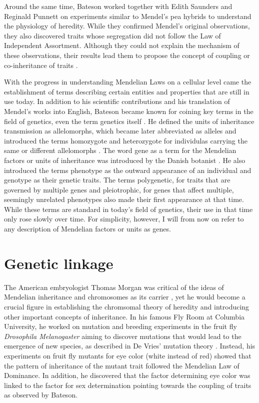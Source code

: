 Around the same time, Bateson worked together with Edith Saunders and Reginald Punnett on experiments similar to Mendel's pea hybrids to understand the physiology of heredity. While they confirmed Mendel's original observations, they also discovered traits whose segregation did not follow the Law of Independent Assortment. Although they could not explain the mechanism of these observations, their results lead them to propose the concept of coupling or co-inheritance of traits \citep{Bateson1905}. 

With the progress in understanding Mendelian Laws on a cellular level came the establishment of terms describing certain entities and properties that are still in use today. In addition to his scientific contributions and his translation of Mendel's works into English, Bateson became known for coining key terms in the field of genetics, even the term genetics itself \citep{Dunwell2007}. He defined the units of inheritance transmission as allelomorphs, which became later abbreviated as alleles and introduced the terms homozygote and heterozygote for individulas carrying the same or different allelomorphs \citep{Bateson1902}. The word gene as a term for the Mendelian factors or units of inheritance was introduced by the Danish botanist \citet{Johannsen1911}. He also introduced the terms phenotype as the outward appearance of an individual and genotype as their genetic traits. The terms polygenetic, for traits that are governed by multiple genes \citep{East1910} and pleiotrophic, for genes that affect multiple, seemingly unrelated phenotypes \citep[page 597]{Plate1910} also made their first appearance at that time. While these terms are standard in today's field of genetics, their use in that time only rose slowly over time. For simplicity, however, I will from now on refer to any description of Mendelian factors or units as genes. 

\section{Genetic linkage}
The American embryologist Thomas Morgan was critical of the ideas of Mendelian inheritance and chromosomes as its carrier \citep{Allen1968}, yet he would become a crucial figure in establishing the chromsomal theory of heredity and introducing other important concepts of inheritance. In his famous Fly Room at Columbia University, he worked on mutation and breeding experiments in the fruit fly \textit{Drosophila Melanogaster} aiming to discover mutations that would lead to the emergence of new species, as described in De Vries' mutation theory \citep{Allen1968}. Instead, his experiments on fruit fly mutants for eye color (white instead of red) showed that the pattern of inheritance of the mutant trait followed the Mendelian Law of Dominance. In addition, he discovered that the factor determining eye color was linked to the factor for sex determination \citep{Morgan1910,Morgan1911a} pointing towards the coupling of traits as observed by Bateson.

